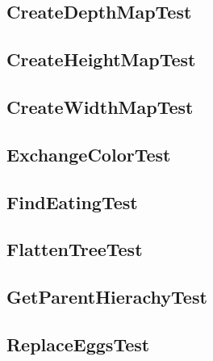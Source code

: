 \subsection{CreateDepthMapTest}
\subsection{CreateHeightMapTest}
\subsection{CreateWidthMapTest}
\subsection{ExchangeColorTest}
\subsection{FindEatingTest}
\subsection{FlattenTreeTest}
\subsection{GetParentHierachyTest}
\subsection{ReplaceEggsTest}
